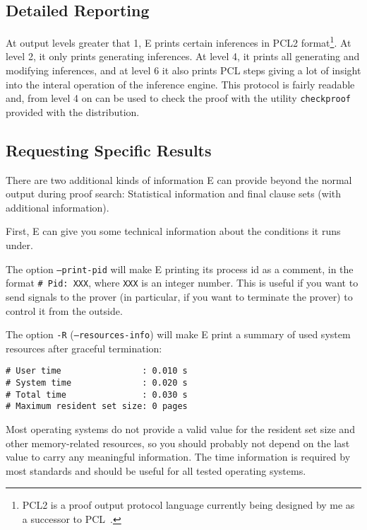 \documentclass{article}
\begin{document}
\subsection{Detailed Reporting}
\label{sec:output:lots}

At output levels greater that 1, E prints certain inferences in PCL2
format\footnote{PCL2 is a proof output protocol language currently
  being designed by me as a successor to
  PCL~\cite{DS94a,DS94b,DS96a}.}.  At level 2, it only prints
generating inferences. At level 4, it prints all generating and
modifying inferences, and at level 6 it also prints PCL steps giving a
lot of insight into the interal operation of the inference engine.
This protocol is fairly readable and, from level 4 on can be used to
check the proof with the utility \texttt{checkproof} provided with the
distribution.


\subsection{Requesting Specific Results}
\label{sec:output:results}

There are two additional kinds of information E can provide beyond the
normal output during proof search: Statistical information and final
clause sets (with additional information).

First, E can give you some technical information about the conditions
it runs under. 

The option \texttt{--print-pid} will make E printing its process id as
a comment, in the format \texttt{\# Pid: XXX}, where \texttt{XXX} is an
integer number. This is useful if you want to send signals to the
prover (in particular, if you want to terminate the prover) to control
it from the outside.

The option \texttt{-R} (\texttt{--resources-info}) will make E print a
summary of used system resources after graceful termination:

\begin{verbatim}
# User time                : 0.010 s
# System time              : 0.020 s
# Total time               : 0.030 s
# Maximum resident set size: 0 pages
\end{verbatim}

Most operating systems do not provide a valid value for the resident
set size and other memory-related resources, so you should probably
not depend on the last value to carry any meaningful information. The
time information is required by most standards and should be useful
for all tested operating systems.
\end{document}
